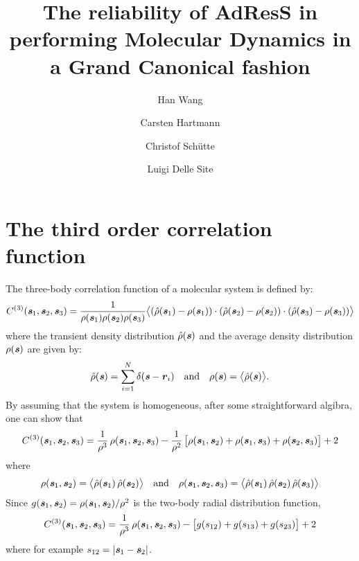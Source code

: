 \documentclass[aip,jcp,a4paper,reprint,onecolumn]{revtex4-1}
\newcommand{\vect}[1]{\textbf{\textit{#1}}}
\newcommand{\corr}{C^{(3)}}
\begin{document}
\title{The reliability of AdResS in performing  Molecular Dynamics in a Grand Canonical fashion}
\author{Han Wang}
\author{Carsten Hartmann}
\author{Christof Sch\"utte}
\author{Luigi Delle Site}

\begin{abstract}
\end{abstract}

\maketitle

\newpage
\section{The third order correlation function}

The three-body correlation function of a molecular system is defined by:
\begin{align}
  \corr (\vect s_1, \vect s_2, \vect s_3)
  =
  \frac1{\rho(\vect s_1)\rho(\vect s_2)\rho(\vect s_3)}
  \big\langle
  (\hat\rho(\vect s_1) - \rho(\vect s_1))\cdot
  (\hat\rho(\vect s_2) - \rho(\vect s_2))\cdot
  (\hat\rho(\vect s_3) - \rho(\vect s_3))
  \big\rangle
\end{align}
where the transient density distribution $\hat\rho(\vect s)$ and the
average density distribution $\rho(\vect s)$ are given
by:
\begin{align}
  \hat\rho(\vect s) = \sum_{i=1}^N\delta(\vect s - \vect r_i)
  \quad\textrm{and}\quad
  \rho(\vect s) = \big\langle \hat\rho(\vect s)\big\rangle.
\end{align}
By assuming that the system is homogeneous, 
after some straightforward algibra, one can show that
\begin{align}
  \corr (\vect s_1, \vect s_2, \vect s_3)
  =
  \frac1{\rho^3}\,\rho(\vect s_1, \vect s_2, \vect s_3) -
  \frac1{\rho^2}\,\big[
  \rho(\vect s_1, \vect s_2) +
  \rho(\vect s_1, \vect s_3) +
  \rho(\vect s_2, \vect s_3)
  \big] + 2
\end{align}
where
\begin{align}
  \rho(\vect s_1, \vect s_2)
  =
  \big\langle
  \hat\rho(\vect s_1)\,  \hat\rho(\vect s_2)
  \big\rangle
  \quad\textrm{and}\quad
  \rho(\vect s_1, \vect s_2, \vect s_3)
  =
  \big\langle
  \hat\rho(\vect s_1)\,  \hat\rho(\vect s_2)\, \hat\rho(\vect s_3)
  \big\rangle  
\end{align}
Since $g (\vect s_1, \vect s_2) = \rho(\vect s_1, \vect s_2)/\rho^2$
is the two-body radial distribution function, 
\begin{align}
  \corr (\vect s_1, \vect s_2, \vect s_3)
  =
  \frac1{\rho^3}\,\rho(\vect s_1, \vect s_2, \vect s_3) -
  \big[
  g(s_{12}) +
  g(s_{13}) +
  g(s_{23})
  \big] + 2
\end{align}
where for example $s_{12} = \vert \vect s_1 -\vect s_2\vert$.
\end{document}
